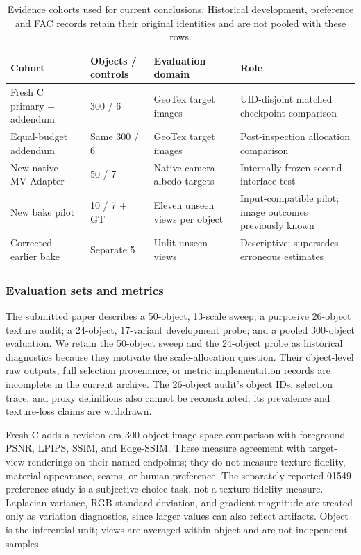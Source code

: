 \documentclass[times,twocolumn,final]{elsarticle}
\begin{document}
\begin{table}[t]\centering\scriptsize
\caption{Evidence cohorts used for current conclusions. Historical development, preference and FAC records retain their original identities and are not pooled with these rows.}
\label{tab:cohort-map}
\begin{tabular}{llll}
\toprule Cohort & Objects / controls & Evaluation domain & Role \\
\midrule
Fresh C primary + addendum & 300 / 6 & GeoTex target images & UID-disjoint matched checkpoint comparison \\
Equal-budget addendum & Same 300 / 6 & GeoTex target images & Post-inspection allocation comparison \\
New native MV-Adapter & 50 / 7 & Native-camera albedo targets & Internally frozen second-interface test \\
New bake pilot & 10 / 7 + GT & Eleven unseen views per object & Input-compatible pilot; image outcomes previously known \\
Corrected earlier bake & Separate 5 & Unlit unseen views & Descriptive; supersedes erroneous estimates \\
\bottomrule\end{tabular}
\end{table}

\subsubsection{Evaluation sets and metrics}

The submitted paper describes a 50-object, 13-scale sweep; a purposive 26-object texture audit; a 24-object, 17-variant development probe; and a pooled 300-object evaluation. We retain the 50-object sweep and the 24-object probe as historical diagnostics because they motivate the scale-allocation question. Their object-level raw outputs, full selection provenance, or metric implementation records are incomplete in the current archive. The 26-object audit's object IDs, selection trace, and proxy definitions also cannot be reconstructed; its prevalence and texture-loss claims are withdrawn.

Fresh C adds a revision-era 300-object image-space comparison with foreground PSNR, LPIPS, SSIM, and Edge-SSIM. These measure agreement with target-view renderings on their named endpoints; they do not measure texture fidelity, material appearance, seams, or human preference. The separately reported 01549 preference study is a subjective choice task, not a texture-fidelity measure. Laplacian variance, RGB standard deviation, and gradient magnitude are treated only as variation diagnostics, since larger values can also reflect artifacts. Object is the inferential unit; views are averaged within object and are not independent samples.
\end{document}
